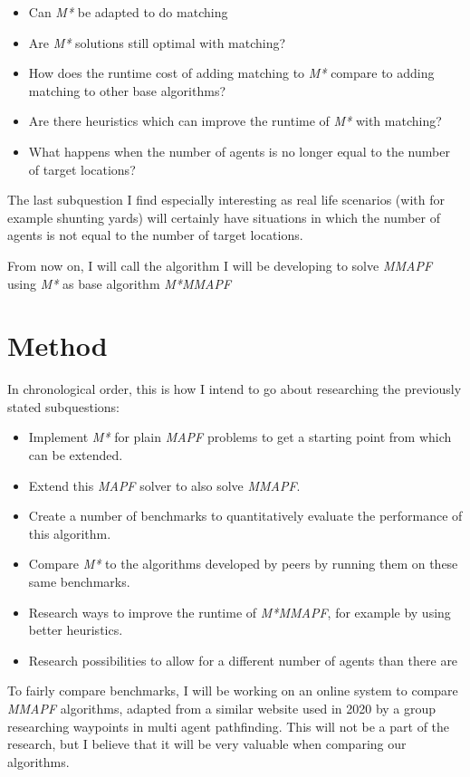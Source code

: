 \documentclass[english]{article}
\begin{document}
\begin{itemize}
    \item Can \textit{M*} be adapted to do matching
    \item Are \textit{M*} solutions still optimal with matching?
    \item How does the runtime cost of adding matching to \textit{M*} compare to adding matching to other base algorithms?
    \item Are there heuristics which can improve the runtime of \textit{M*} with matching?
    \item What happens when the number of agents is no longer equal to the number of target locations?
\end{itemize}

The last subquestion I find especially interesting as real life scenarios (with for example shunting yards) will certainly have situations in which the number of agents is not equal to the number of target locations. 

From now on, I will call the algorithm I will be developing to solve \textit{MMAPF} using \textit{M*} as base algorithm \textit{M*MMAPF}

\section{Method}

In chronological order, this is how I intend to go about researching the previously stated subquestions:

\begin{itemize}
    \item Implement \textit{M*} for plain \textit{MAPF} problems to get a starting point from which can be extended. 
    \item Extend this \textit{MAPF} solver to also solve \textit{MMAPF}.
    \item Create a number of benchmarks to quantitatively evaluate the performance of this algorithm.
    \item Compare \textit{M*} to the algorithms developed by peers by running them on these same benchmarks.
    \item Research ways to improve the runtime of \textit{M*MMAPF}, for example by using better heuristics.
    \item Research possibilities to allow for a different number of agents than there are 
\end{itemize}

To fairly compare benchmarks, I will be working on an online system to compare \textit{MMAPF} algorithms, adapted from a similar website used in 2020 by a group researching waypoints in multi agent pathfinding. This will not be a part of the research, but I believe that it will be very valuable when comparing our algorithms.
\end{document}
